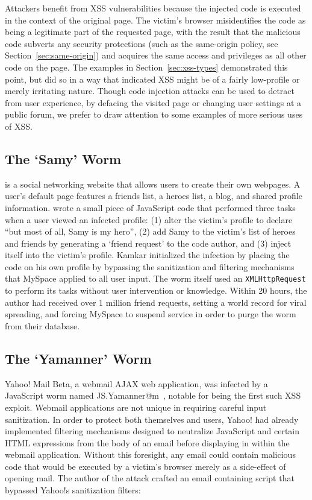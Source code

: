\documentclass{acmtrans2m}
\begin{document}
Attackers benefit from XSS vulnerabilities because the injected code is executed in the context of the original page.
The victim's browser misidentifies the code as being a legitimate part of the requested page, with the result that the malicious code subverts any security protections (such as the same-origin policy, see Section~\ref{sec:same-origin}) and acquires the same access and privileges as all other code on the page.
The examples in Section~\ref{sec:xss-types} demonstrated this point, but did so in a way that indicated XSS might be of a fairly low-profile or merely irritating nature.
Though code injection attacks can be used to detract from user experience, by defacing the visited page or changing user settings at a public forum, we prefer to draw attention to some examples of more serious uses of XSS.

\subsection{The `Samy' Worm}
 is a social networking website that allows users to create their own webpages.
A user's default page features a friends list, a heroes list, a blog, and shared profile information.
 wrote a small piece of JavaScript code that performed three tasks when a user viewed an infected profile: (1) alter the victim's profile to declare ``but most of all, Samy is my hero'', (2) add Samy to the victim's list of heroes and friends by generating a `friend request' to the code author, and (3) inject itself into the victim's profile.
Kamkar initialized the infection by placing the code on his own profile by bypassing the sanitization and filtering mechanisms that MySpace applied to all user input.
The worm itself used an \texttt{XMLHttpRequest} to perform its tasks without user intervention or knowledge.
Within 20 hours, the author had received over 1 million friend requests, setting a world record for viral spreading, and forcing MySpace to suspend service in order to purge the worm from their database.

\subsection{The `Yamanner' Worm}
Yahoo! Mail Beta, a webmail AJAX web application, was infected by a JavaScript worm named JS.Yamanner@m~\cite{yamanner}, notable for being the first such XSS exploit.
Webmail applications are not unique in requiring careful input sanitization.
In order to protect both themselves and users, Yahoo! had already implemented filtering mechanisms designed to neutralize JavaScript and certain HTML expressions from the body of an email before displaying in within the webmail application.
Without this foresight, any email could contain malicious code that would be executed by a victim's browser merely as a side-effect of opening mail.
The author of the attack crafted an email containing script that bypassed Yahoo!s sanitization filters:
\end{document}
